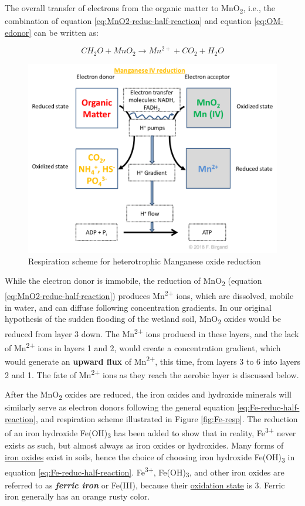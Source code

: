 \documentclass[]{book}
\theoremstyle{definition}
\theoremstyle{definition}
\theoremstyle{definition}
\theoremstyle{remark}
\begin{document}
The overall transfer of electrons from the organic matter to
MnO\textsubscript{2}, i.e., the combination of equation
\eqref{eq:MnO2-reduc-half-reaction} and equation \eqref{eq:OM-edonor} can be
written as:

\begin{equation}
CH_2O + MnO_2 \rightarrow Mn^{2+} + CO_2 + H_2O 
\label{eq:MnO2-reduc}
\end{equation}

\begin{figure}

{\centering \includegraphics[width=0.75\linewidth]{pictures/respiration-OM-Mn} 

}

\caption{Respiration scheme for heterotrophic Manganese oxide reduction}\label{fig:MnO2-resp}
\end{figure}

While the electron donor is immobile, the reduction of
MnO\textsubscript{2} (equation \eqref{eq:MnO2-reduc-half-reaction})
produces Mn\textsuperscript{2+} ions, which are dissolved, mobile in
water, and can diffuse following concentration gradients. In our
original hypothesis of the sudden flooding of the wetland soil,
MnO\textsubscript{2} oxides would be reduced from layer 3 down. The
Mn\textsuperscript{2+} ions produced in these layers, and the lack of
Mn\textsuperscript{2+} ions in layers 1 and 2, would create a
concentration gradient, which would generate an \textbf{upward flux} of
Mn\textsuperscript{2+}, this time, from layers 3 to 6 into layers 2 and
1. The fate of Mn\textsuperscript{2+} ions as they reach the aerobic
layer is discussed below.

After the MnO\textsubscript{2} oxides are reduced, the iron oxides and
hydroxide minerals will similarly serve as electron donors following the
general equation \eqref{eq:Fe-reduc-half-reaction}, and respiration scheme
illustrated in Figure \ref{fig:Fe-resp}. The reduction of an iron
hydroxide Fe(OH)\textsubscript{3} has been added to show that in
reality, Fe\textsuperscript{3+} never exists as such, but almost always
as iron oxides or hydroxides. Many forms of
\href{https://en.wikipedia.org/wiki/Iron_oxide}{iron oxides} exist in
soils, hence the choice of choosing iron hydroxide
Fe(OH)\textsubscript{3} in equation \eqref{eq:Fe-reduc-half-reaction}.
Fe\textsuperscript{3+}, Fe(OH)\textsubscript{3}, and other iron oxides
are referred to as \emph{\textbf{ferric iron}} or Fe(III), because their
\protect\hyperlink{oxidation-state}{oxidation state} is 3. Ferric iron
generally has an orange rusty color.
\end{document}
